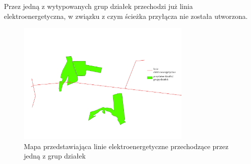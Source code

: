 \documentclass{article}
\begin{document}
Przez jedną z wytypowanych grup działek przechodzi już linia elektroenergetyczna, w związku z czym ścieżka przyłącza nie została utworzona.

\begin{figure}[H]
    \centering
    \includegraphics[width=0.75\textwidth]{img/plesna-braksciezki.jpg}
    \caption{Mapa przedstawiająca linie elektroenergetyczne przechodzące przez jedną z grup działek}
\end{figure}
\end{document}
